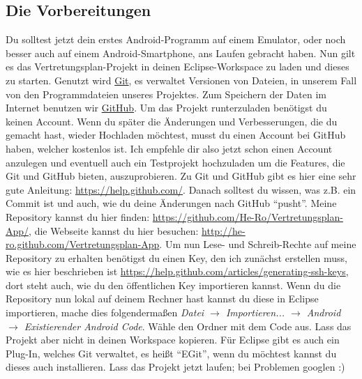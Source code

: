 \documentclass[12pt,headsepline]{scrartcl}
\begin{document}
\subsection{Die Vorbereitungen}
Du solltest jetzt dein erstes Android-Programm auf einem Emulator, oder noch besser auch auf einem Android-Smartphone, ans Laufen gebracht haben. Nun gilt es das Vertretungsplan-Projekt in deinen Eclipse-Workspace zu laden und dieses zu starten.
Genutzt wird \href{http://git-scm.com/}{Git}, es verwaltet Versionen von Dateien, in unserem Fall von den Programmdateien unseres Projektes. Zum Speichern der Daten im Internet benutzen wir \href{http://www.github.com}{GitHub}. Um das Projekt runterzuladen benötigst du keinen Account. Wenn du später die Änderungen und Verbesserungen, die du gemacht hast, wieder Hochladen möchtest, musst du einen Account bei GitHub haben, welcher kostenlos ist. Ich empfehle dir also jetzt schon einen Account anzulegen und eventuell auch ein Testprojekt hochzuladen um die Features, die Git und GitHub bieten, auszuprobieren. Zu Git und GitHub gibt es hier eine sehr gute Anleitung: \url{https://help.github.com/}. Danach solltest du wissen, was z.B. ein Commit ist und auch, wie du deine Änderungen nach GitHub ``pusht''.
Meine Repository kannst du hier finden: \url{https://github.com/He-Ro/Vertretungsplan-App/}, die Webseite kannst du hier besuchen: \url{http://he-ro.github.com/Vertretungsplan-App}.
Um nun Lese- und Schreib-Rechte auf meine Repository zu erhalten benötigst du einen Key, den ich zunächst erstellen muss, wie es hier beschrieben ist \url{https://help.github.com/articles/generating-ssh-keys}, dort steht auch, wie du den öffentlichen Key importieren kannst.
Wenn du die Repository nun lokal auf deinem Rechner hast kannst du diese in Eclipse importieren, mache dies folgendermaßen \textit{Datei $\rightarrow$ Importieren... $\rightarrow$ Android $\rightarrow$ Existierender Android Code}. Wähle den Ordner mit dem Code aus. Lass das Projekt aber nicht in deinen Workspace kopieren. Für Eclipse gibt es auch ein Plug-In, welches Git verwaltet, es heißt ``EGit'', wenn du möchtest kannst du dieses auch installieren.
Lass das Projekt jetzt laufen; bei Problemen googlen :)
\newpage
\end{document}
